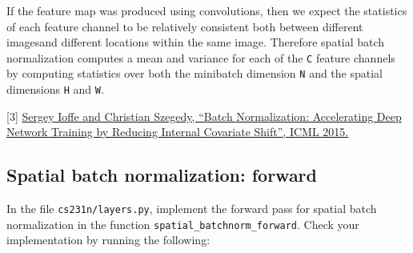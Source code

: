 \documentclass[11pt]{article}
\begin{document}
If the feature map was produced using convolutions, then we expect the
statistics of each feature channel to be relatively consistent both
between different imagesand different locations within the same image.
Therefore spatial batch normalization computes a mean and variance for
each of the \texttt{C} feature channels by computing statistics over
both the minibatch dimension \texttt{N} and the spatial dimensions
\texttt{H} and \texttt{W}.

{[}3{]} \href{https://arxiv.org/abs/1502.03167}{Sergey Ioffe and
Christian Szegedy, ``Batch Normalization: Accelerating Deep Network
Training by Reducing Internal Covariate Shift'', ICML 2015.}

    \hypertarget{spatial-batch-normalization-forward}{%
\subsection{Spatial batch normalization:
forward}\label{spatial-batch-normalization-forward}}

In the file \texttt{cs231n/layers.py}, implement the forward pass for
spatial batch normalization in the function
\texttt{spatial\_batchnorm\_forward}. Check your implementation by
running the following:
\end{document}
